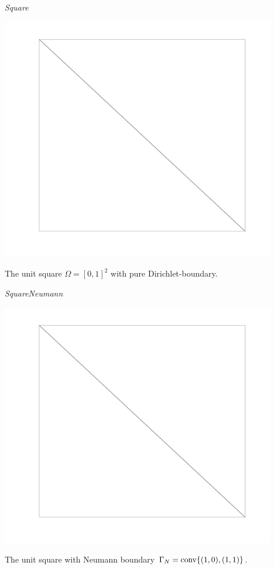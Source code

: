 \noindent\emph{Square}\smallskip\\
\begin{minipage}{0.14\textwidth}
\includegraphics[width=0.9\textwidth]{images/sect_ImplementedProblems_Square.pdf}
\end{minipage}
\begin{minipage}{0.85\textwidth}
The unit square $\Omega=[0,1]^2$ with pure Dirichlet-boundary.
\end{minipage}
\bigskip

\noindent\emph{SquareNeumann}\smallskip\\
\begin{minipage}{0.14\textwidth}
\includegraphics[width=0.9\textwidth]{images/sect_ImplementedProblems_Square.pdf}
\end{minipage}
\begin{minipage}{0.85\textwidth}
The unit square with Neumann boundary $\Gamma_N=\operatorname{conv}\{(1,0),(1,1)\}$.
\end{minipage}
\bigskip

